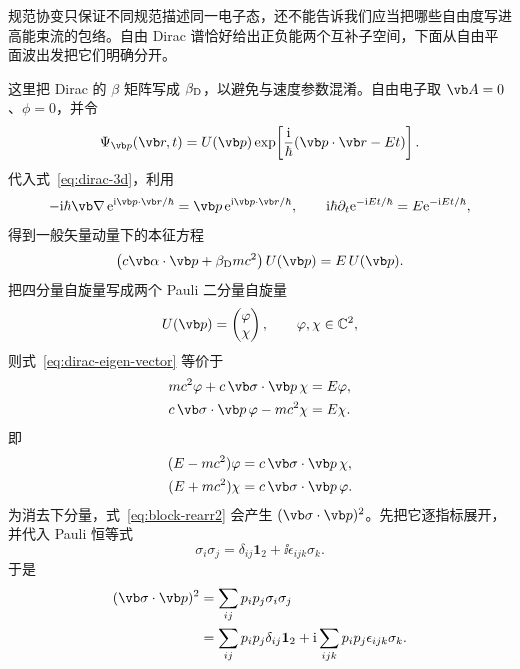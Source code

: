 规范协变只保证不同规范描述同一电子态，还不能告诉我们应当把哪些自由度写进高能束流的包络。自由 Dirac 谱恰好给出正负能两个互补子空间，下面从自由平面波出发把它们明确分开。


这里把 Dirac 的 $\beta$ 矩阵写成 $\beta_{\rm D}$，以避免与速度参数混淆。自由电子取 $\vb A=0$、$\phi=0$，并令
\begin{equation}
 \Psi_{\vb p}(\vb r,t)
 =U(\vb p)\exp\!\left[\frac{\ii}{\hbar}(\vb p\cdot\vb r-Et)\right].
 \label{eq:dirac-plane-wave-vector}
\end{equation}
代入式~\cref{eq:dirac-3d}，利用
\[
 -\ii\hbar\vb\nabla\,
 \ee^{\ii\vb p\cdot\vb r/\hbar}
 =\vb p\,\ee^{\ii\vb p\cdot\vb r/\hbar},
 \qquad
 \ii\hbar\partial_t\ee^{-\ii Et/\hbar}
 =E\ee^{-\ii Et/\hbar},
\]
得到一般矢量动量下的本征方程
\begin{equation}
 \left(c\vb\alpha\cdot\vb p+\beta_{\rm D}mc^2\right)U(\vb p)
 =E\,U(\vb p).
 \label{eq:dirac-eigen-vector}
\end{equation}
把四分量自旋量写成两个 Pauli 二分量自旋量
\begin{equation}
 U(\vb p)=
 \begin{pmatrix}\varphi\\ \chi\end{pmatrix},
 \qquad \varphi,\chi\in\mathbb C^2,
\end{equation}
则式~\cref{eq:dirac-eigen-vector} 等价于
\begin{align}
 mc^2\varphi+c\,\vb\sigma\cdot\vb p\,\chi&=E\varphi,
 \label{eq:dirac-block1}\\
 c\,\vb\sigma\cdot\vb p\,\varphi-mc^2\chi&=E\chi.
 \label{eq:dirac-block2}
\end{align}
即
\begin{align}
 (E-mc^2)\varphi&=c\,\vb\sigma\cdot\vb p\,\chi,
 \label{eq:block-rearr1}\\
 (E+mc^2)\chi&=c\,\vb\sigma\cdot\vb p\,\varphi.
 \label{eq:block-rearr2}
\end{align}
为消去下分量，式~\cref{eq:block-rearr2} 会产生 $(\vb\sigma\cdot\vb p)^2$。先把它逐指标展开，并代入 Pauli 恒等式
\begin{equation}
 \sigma_i\sigma_j=\delta_{ij}\mathbf 1_2+\ii\epsilon_{ijk}\sigma_k.
\end{equation}
于是
\begin{align}
 (\vb\sigma\cdot\vb p)^2
 &=\sum_{ij}p_ip_j\sigma_i\sigma_j\\
 &=\sum_{ij}p_ip_j\delta_{ij}\mathbf 1_2
 +\ii\sum_{ijk}p_ip_j\epsilon_{ijk}\sigma_k.
\end{align}
